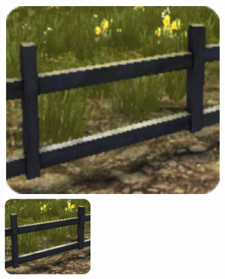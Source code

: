 \begin{enumerate}
\begin{figure}[H]
\begin{minipage}{0.5\textwidth}
  \includegraphics[width=1.0\linewidth]{src/test1.png}
\end{minipage}%
\begin{minipage}{0.5\textwidth}
  \includegraphics[width=1.0\linewidth]{src/ans1.png}
\end{minipage}
\end{figure}


\end{enumerate}
